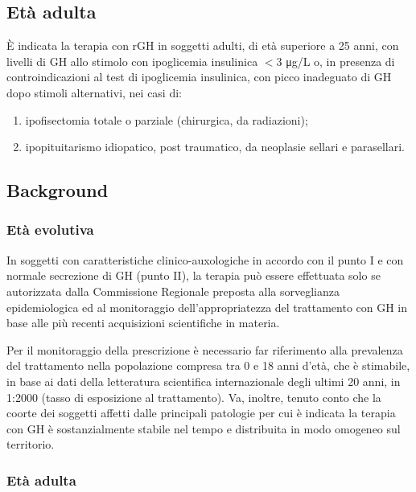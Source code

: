 \subsection*{Et\`a adulta}

\`E indicata la terapia con rGH in soggetti adulti, di et\`a superiore a 25 anni, con livelli di GH allo stimolo con
ipoglicemia insulinica $<$3 \unit{\micro g}/L o, in presenza di controindicazioni al test di ipoglicemia insulinica, con picco
inadeguato di GH dopo stimoli alternativi, nei casi di:
\begin{enumerate}
	\renewcommand{\theenumi}{\alph{enumi})}
	\renewcommand{\labelenumi}{\theenumi}
	\item 	ipofisectomia totale o parziale (chirurgica, da radiazioni);
	\item	ipopituitarismo idiopatico, post traumatico, da neoplasie sellari e parasellari.
\end{enumerate}

\subsection*{Background}

\subsubsection*{Et\`a evolutiva}

In soggetti con caratteristiche clinico-auxologiche in accordo con il punto I e con normale secrezione di GH
(punto II), la terapia può essere effettuata solo se autorizzata dalla Commissione Regionale preposta alla
sorveglianza epidemiologica ed al monitoraggio dell'appropriatezza del trattamento con GH in base alle più
recenti acquisizioni scientifiche in materia. 

Per il monitoraggio della prescrizione \`e necessario far riferimento
alla prevalenza del trattamento nella popolazione compresa tra 0 e 18 anni d'et\`a, che \`e stimabile, in base ai
dati della letteratura scientifica internazionale degli ultimi 20 anni, in 1:2000 (tasso di esposizione al
trattamento). Va, inoltre, tenuto conto che la coorte dei soggetti affetti dalle principali patologie per cui \`e
indicata la terapia con GH \`e sostanzialmente stabile nel tempo e distribuita in modo omogeneo sul territorio.

\subsubsection*{Et\`a adulta}

